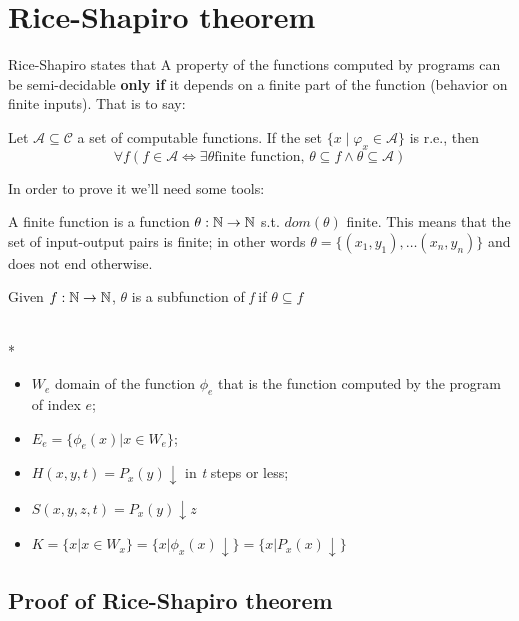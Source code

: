 \chapter {Rice-Shapiro theorem}
Rice-Shapiro states that A property of the functions computed by
programs can be semi-decidable \textbf{only if} it depends on a finite
part of the function (behavior on finite inputs). That is to say:

\begin{theorem}

  Let $\mathcal{A} \subseteq \mathcal{C}$ a set of computable
  functions. If the set $\{x \mid \varphi_x \in \mathcal{A}\}$ is
  r.e., then
  \[
    \forall f (f \in \mathcal{A} \Leftrightarrow \exists \theta \mbox{
      finite function, } \theta \subseteq f \land \theta \subseteq
    \mathcal{A})
  \]
\end{theorem}

In order to prove it we'll need some tools:

\begin{definition}
  A finite function is a function $ \theta: \mathbb{N}\rightarrow\mathbb{N} $
  s.t. $ dom(\theta) $ finite.  This means that the set of
  input-output pairs is finite; in other words
  $ \theta = \{(x_1,y_1),\dots(x_n,y_n) \} $ and does not end
  otherwise.
\end{definition}

Given $ f:\mathbb{N}\rightarrow\mathbb{N} $, $ \theta $ is a subfunction of
\textit{f} if $ \theta \subseteq f $

\begin{notation}\mbox{}\\*
  \begin{itemize}
  \item $ W_e $ domain of the function $ \phi_e $ that is the function
    computed by the program of index $e$;
  \item $ E_e = \{\phi_e(x)|x\in W_e \}$;
  \item $ H(x,y,t) = P_x(y)\downarrow $ in \textit{t} steps or less;
  \item $ S(x,y,z,t) = P_x(y)\downarrow z $
  \item $ K = \{x|x\in W_x \} = \{x|\phi_x(x)\downarrow \} =
    \{x|P_x(x)\downarrow \}$
  \end{itemize}
\end{notation}

\section{Proof of Rice-Shapiro theorem}

